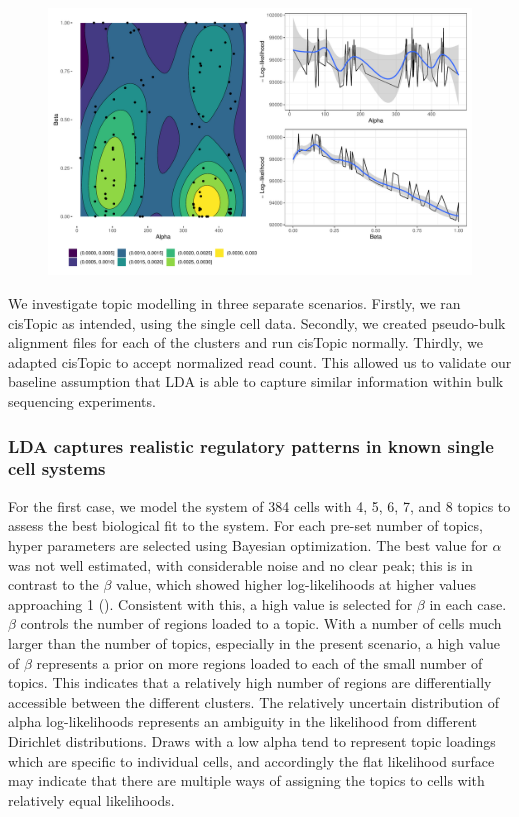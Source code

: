 \begin{figure}
  \centering
  \includegraphics[width=\textwidth]{plot/ch4/sim_ll_surface.pdf}
  \label{fig:llhood_surfacea_simulation}
\end{figure}

We investigate topic modelling in three separate scenarios. Firstly, we ran cisTopic as intended, using the single cell data. Secondly, we created pseudo-bulk alignment files for each of the clusters and run cisTopic normally. Thirdly, we adapted cisTopic to accept normalized read count. This allowed us to validate our baseline assumption that LDA is able to capture similar information within bulk sequencing experiments.

\subsubsection{LDA captures realistic regulatory patterns in known single cell systems} \label{ch4:sc}

For the first case, we model the system of 384 cells with 4, 5, 6, 7, and 8 topics to assess the best biological fit to the system. For each pre-set number of topics, hyper parameters are selected using Bayesian optimization. The best value for $\alpha$ was not well estimated, with considerable noise and no clear peak; this is in contrast to the $\beta$ value, which showed higher log-likelihoods at higher values approaching 1 (). Consistent with this, a high value is selected for $\beta$ in each case. $\beta$ controls the number of regions loaded to a topic. With a number of cells much larger than the number of topics, especially in the present scenario, a high value of $\beta$ represents a prior on more regions loaded to each of the small number of topics. This indicates that a relatively high number of regions are differentially accessible between the different clusters. The relatively uncertain distribution of alpha log-likelihoods represents an ambiguity in the likelihood from different Dirichlet distributions. Draws with a low alpha tend to represent topic loadings which are specific to individual cells, and accordingly the flat likelihood surface may indicate that there are multiple ways of assigning the topics to cells with relatively equal likelihoods.


